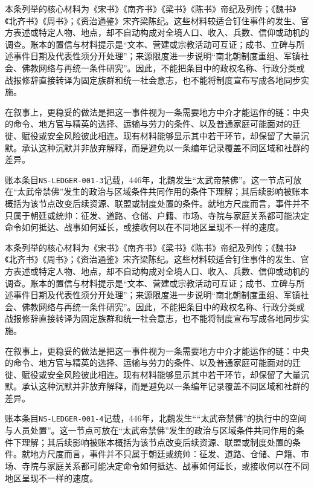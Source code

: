 本条列举的核心材料为《宋书》《南齐书》《梁书》《陈书》帝纪及列传；《魏书》《北齐书》《周书》；《资治通鉴》宋齐梁陈纪。这些材料较适合钉住事件的发生、官方表述或特定人物、地点，却不自动构成对全境人口、收入、兵数、信仰或动机的调查。账本的置信与材料提示是“文本、营建或宗教活动可互证；成书、立碑与所述事件日期及代表性须分开处理”；来源限度进一步说明“南北朝制度重组、军镇社会、佛教网络与再统一条件研究”。因此，不能把条目中的政权名称、行政分类或战报修辞直接转译为固定族群和统一社会意志，也不能将制度宣布写成各地同步实施。

在叙事上，更稳妥的做法是把这一事件视为一条需要地方中介才能运作的链：中央的命令、地方官与精英的选择、运输与劳力的条件、以及普通家庭可能面对的迁徙、赋役或安全风险彼此相连。现有材料能够显示其中若干环节，却保留了大量沉默。承认这种沉默并非放弃解释，而是避免以一条编年记录覆盖不同区域和社群的差异。

账本条目\texttt{NS-LEDGER-001-3}记载，446年，北魏发生“太武帝禁佛”。这一节点可放在“太武帝禁佛”发生的政治与区域条件共同作用的条件下理解；其后续影响被账本概括为该节点改变后续资源、联盟或制度处置的条件。就地方尺度而言，事件并不只属于朝廷或统帅：征发、道路、仓储、户籍、市场、寺院与家庭关系都可能决定命令如何抵达、战事如何延长，或接收何以在不同地区呈现不一样的速度。

本条列举的核心材料为《宋书》《南齐书》《梁书》《陈书》帝纪及列传；《魏书》《北齐书》《周书》；《资治通鉴》宋齐梁陈纪。这些材料较适合钉住事件的发生、官方表述或特定人物、地点，却不自动构成对全境人口、收入、兵数、信仰或动机的调查。账本的置信与材料提示是“文本、营建或宗教活动可互证；成书、立碑与所述事件日期及代表性须分开处理”；来源限度进一步说明“南北朝制度重组、军镇社会、佛教网络与再统一条件研究”。因此，不能把条目中的政权名称、行政分类或战报修辞直接转译为固定族群和统一社会意志，也不能将制度宣布写成各地同步实施。

在叙事上，更稳妥的做法是把这一事件视为一条需要地方中介才能运作的链：中央的命令、地方官与精英的选择、运输与劳力的条件、以及普通家庭可能面对的迁徙、赋役或安全风险彼此相连。现有材料能够显示其中若干环节，却保留了大量沉默。承认这种沉默并非放弃解释，而是避免以一条编年记录覆盖不同区域和社群的差异。

账本条目\texttt{NS-LEDGER-001-4}记载，446年，北魏发生““太武帝禁佛”的执行中的空间与人员处置”。这一节点可放在“太武帝禁佛”发生的政治与区域条件共同作用的条件下理解；其后续影响被账本概括为该节点改变后续资源、联盟或制度处置的条件。就地方尺度而言，事件并不只属于朝廷或统帅：征发、道路、仓储、户籍、市场、寺院与家庭关系都可能决定命令如何抵达、战事如何延长，或接收何以在不同地区呈现不一样的速度。

